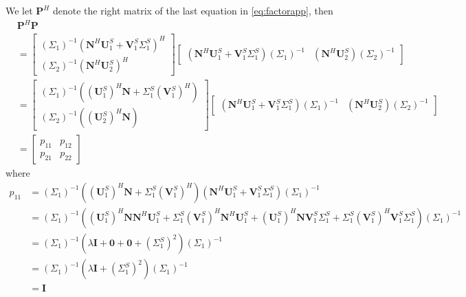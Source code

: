 We let $\mathbf{P}^H$ denote the right matrix of the last equation in \ref{eq:factorapp}, then
\begin{equation}
\label{eq:vhv}
\begin{split}
&\mathbf{P}^H\mathbf{P} \\
&=\left[\begin{array}{c} 
(\Sigma_1)^{-1}(\mathbf{N}^H\mathbf{U}_1^S+\mathbf{V}_1^S\Sigma_1^S)^H\\
(\Sigma_2)^{-1}(\mathbf{N}^H\mathbf{U}_2^S)^H
\end{array}
\right]\left[\begin{array}{cc} 
(\mathbf{N}^H\mathbf{U}_1^S+\mathbf{V}_1^S\Sigma_1^S)(\Sigma_1)^{-1} &(\mathbf{N}^H\mathbf{U}_2^S)(\Sigma_2)^{-1}
\end{array}\right] \\
&=\left[\begin{array}{c} 
(\Sigma_1)^{-1}((\mathbf{U}_1^S)^H\mathbf{N}+\Sigma_1^S(\mathbf{V}_1^S)^H)\\
(\Sigma_2)^{-1}((\mathbf{U}_2^S)^H\mathbf{N})
\end{array}
\right]\left[\begin{array}{cc} 
(\mathbf{N}^H\mathbf{U}_1^S+\mathbf{V}_1^S\Sigma_1^S)(\Sigma_1)^{-1} &(\mathbf{N}^H\mathbf{U}_2^S)(\Sigma_2)^{-1}
\end{array}\right]\\
&=\left[\begin{array}{cc} 
p_{11} & p_{12}\\
p_{21} & p_{22}
\end{array}
\right]
\end{split}
\end{equation}
where
\begin{equation}
\label{eq:p11}
\begin{split}
p_{11}&=(\Sigma_1)^{-1}((\mathbf{U}_1^S)^H\mathbf{N}+\Sigma_1^S(\mathbf{V}_1^S)^H) (\mathbf{N}^H\mathbf{U}_1^S+\mathbf{V}_1^S\Sigma_1^S)(\Sigma_1)^{-1} \\
& =(\Sigma_1)^{-1}((\mathbf{U}_1^S)^H\mathbf{N}\mathbf{N}^H\mathbf{U}_1^S+
\Sigma_1^S(\mathbf{V}_1^S)^H\mathbf{N}^H\mathbf{U}_1^S+ 
(\mathbf{U}_1^S)^H\mathbf{N}\mathbf{V}_1^S\Sigma_1^S+
\Sigma_1^S(\mathbf{V}_1^S)^H\mathbf{V}_1^S\Sigma_1^S)(\Sigma_1)^{-1}\\
&=(\Sigma_1)^{-1} (\lambda\mathbf{I}+\mathbf{0}+\mathbf{0}+(\Sigma_1^S)^2)(\Sigma_1)^{-1}\\
&=(\Sigma_1)^{-1} (\lambda\mathbf{I}+(\Sigma_1^S)^2)(\Sigma_1)^{-1} \\
&=\mathbf{I}
\end{split}
\end{equation}
